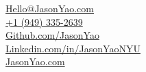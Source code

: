 \documentclass[]{two-column-resume}
\begin{document}
{
    \large  %
    \faEnvelope \hspace{0.1cm} \href{mailto:Hello@JasonYao.com}{Hello@JasonYao.com}\\
    \faPhone \hspace{0.1cm} \href{tel:+1-949-335-2639}{+1 (949) 335-2639} \\
    \faGithub \hspace{0.1cm} \href{https://Github.com/JasonYao}{Github.com/JasonYao}\\
    \faLinkedin \hspace{0.1cm} \href{https://www.Linkedin.com/in/JasonYaoNYU}{Linkedin.com/in/JasonYaoNYU}\\
    \faGlobe \hspace{0.1cm} \href{https://www.JasonYao.com}{JasonYao.com}
}
\end{document}
